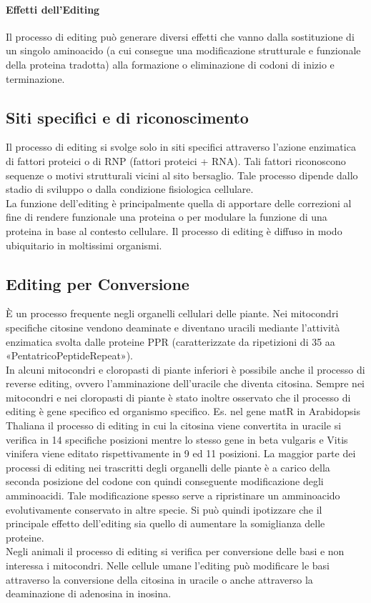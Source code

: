 \documentclass{article}
\begin{document}
\paragraph{Effetti dell'Editing}
Il processo di editing può generare diversi effetti che vanno dalla sostituzione di un singolo aminoacido (a cui consegue una modificazione strutturale e funzionale della proteina tradotta) alla formazione o eliminazione di codoni di inizio e terminazione.
\subsection{Siti specifici e di riconoscimento}
Il processo di editing si svolge solo in siti specifici attraverso l'azione enzimatica di
fattori proteici o di RNP (fattori proteici + RNA). Tali fattori riconoscono sequenze o
motivi strutturali vicini al sito bersaglio. Tale processo dipende dallo stadio di sviluppo
o dalla condizione fisiologica cellulare.\\
La funzione dell'editing è principalmente quella di apportare delle correzioni al fine di rendere funzionale una
proteina o per modulare la funzione di una proteina in base al contesto cellulare. Il processo di editing è diffuso in modo ubiquitario in moltissimi organismi.
\subsection{Editing per Conversione}
È un processo frequente negli organelli cellulari delle piante. Nei mitocondri specifiche citosine vendono deaminate e
diventano uracili mediante l'attività enzimatica svolta dalle proteine PPR (caratterizzate da ripetizioni di 35 aa «PentatricoPeptideRepeat»).\\
In alcuni mitocondri e cloropasti di piante inferiori è possibile anche il processo di reverse editing, ovvero l'amminazione dell'uracile che diventa citosina.
Sempre nei mitocondri e nei cloropasti di piante è stato inoltre osservato che il processo di editing è gene specifico ed
organismo specifico. Es. nel gene matR in Arabidopsis Thaliana il processo di editing in cui la citosina viene
convertita in uracile si verifica in 14 specifiche posizioni mentre lo stesso gene in beta vulgaris e Vitis vinifera
viene editato rispettivamente in 9 ed 11 posizioni.
La maggior parte dei processi di editing nei trascritti degli organelli delle
piante è a carico della seconda posizione del codone con quindi
conseguente modificazione degli amminoacidi. Tale modificazione spesso
serve a ripristinare un amminoacido evolutivamente conservato in altre
specie. Si può quindi ipotizzare che il principale effetto dell'editing sia quello
di aumentare la somiglianza delle proteine.\\
Negli animali il processo di editing si verifica per conversione delle basi e non interessa i mitocondri.
Nelle cellule umane l'editing può modificare le basi attraverso la conversione della citosina in uracile o anche attraverso la deaminazione di adenosina in inosina.
\end{document}
